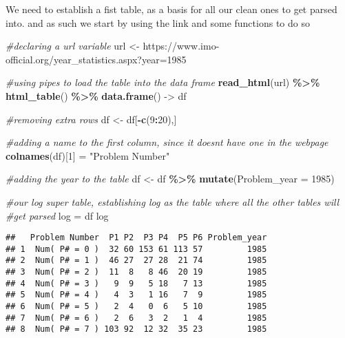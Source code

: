 \documentclass[
]{article}
\newenvironment{Shaded}{\begin{snugshade}}{\end{snugshade}}
\newcommand{\AttributeTok}[1]{\textcolor[rgb]{0.13,0.29,0.53}{#1}}
\newcommand{\CommentTok}[1]{\textcolor[rgb]{0.56,0.35,0.01}{\textit{#1}}}
\newcommand{\DecValTok}[1]{\textcolor[rgb]{0.00,0.00,0.81}{#1}}
\newcommand{\FunctionTok}[1]{\textcolor[rgb]{0.13,0.29,0.53}{\textbf{#1}}}
\newcommand{\NormalTok}[1]{#1}
\newcommand{\OtherTok}[1]{\textcolor[rgb]{0.56,0.35,0.01}{#1}}
\newcommand{\SpecialCharTok}[1]{\textcolor[rgb]{0.81,0.36,0.00}{\textbf{#1}}}
\newcommand{\StringTok}[1]{\textcolor[rgb]{0.31,0.60,0.02}{#1}}
\begin{document}
We need to establish a fist table, as a basis for all our clean ones to
get parsed into. and as such we start by using the link and some
functions to do so

\begin{Shaded}
\begin{Highlighting}[]
\CommentTok{\#declaring a url variable}
\NormalTok{url }\OtherTok{\textless{}{-}} \StringTok{\textquotesingle{}https://www.imo{-}official.org/year\_statistics.aspx?year=1985\textquotesingle{}}

\CommentTok{\#using pipes to load the table into the data frame}
\FunctionTok{read\_html}\NormalTok{(url) }\SpecialCharTok{\%\textgreater{}\%} \FunctionTok{html\_table}\NormalTok{() }\SpecialCharTok{\%\textgreater{}\%} \FunctionTok{data.frame}\NormalTok{() }\OtherTok{{-}\textgreater{}}\NormalTok{ df}

\CommentTok{\#removing extra rows}
\NormalTok{df }\OtherTok{\textless{}{-}}\NormalTok{ df[}\SpecialCharTok{{-}}\FunctionTok{c}\NormalTok{(}\DecValTok{9}\SpecialCharTok{:}\DecValTok{20}\NormalTok{),]}

\CommentTok{\#adding a name to the first column, since it doesn\textquotesingle{}t have one in the webpage}
\FunctionTok{colnames}\NormalTok{(df)[}\DecValTok{1}\NormalTok{] }\OtherTok{=} \StringTok{"Problem Number"}

\CommentTok{\#adding the year to the table}
\NormalTok{df }\OtherTok{\textless{}{-}}\NormalTok{ df }\SpecialCharTok{\%\textgreater{}\%} \FunctionTok{mutate}\NormalTok{(}\AttributeTok{Problem\_year =} \DecValTok{1985}\NormalTok{)}

\CommentTok{\#our log super table, establishing log as the table where all the other tables will}
\CommentTok{\#get parsed}
\NormalTok{log }\OtherTok{=}\NormalTok{ df}
\NormalTok{log}
\end{Highlighting}
\end{Shaded}

\begin{verbatim}
##   Problem Number  P1 P2  P3 P4  P5 P6 Problem_year
## 1  Num( P# = 0 )  32 60 153 61 113 57         1985
## 2  Num( P# = 1 )  46 27  27 28  21 74         1985
## 3  Num( P# = 2 )  11  8   8 46  20 19         1985
## 4  Num( P# = 3 )   9  9   5 18   7 13         1985
## 5  Num( P# = 4 )   4  3   1 16   7  9         1985
## 6  Num( P# = 5 )   2  4   0  6   5 10         1985
## 7  Num( P# = 6 )   2  6   3  2   1  4         1985
## 8  Num( P# = 7 ) 103 92  12 32  35 23         1985
\end{verbatim}
\end{document}
